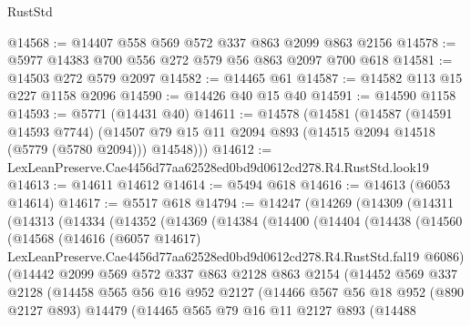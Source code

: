 \begin{lexlean}{RustStd}
\begin{coremodule}
@14568 := @14407 @558 @569 @572 @337 @863 @2099 @863 @2156
@14578 := @5977 @14383 @700 @556 @272 @579 @56 @863 @2097 @700 @618
@14581 := @14503 @272 @579 @2097
@14582 := @14465 @61
@14587 := @14582 @113 @15 @227 @1158 @2096
@14590 := @14426 @40 @15 @40
@14591 := @14590 @1158
@14593 := @5771 (@14431 @40)
@14611 := @14578
    (@14581
      (@14587
        (@14591 @14593 @7744)
        (@14507 @79 @15 @11 @2094 @893 (@14515 @2094 @14518 (@5779 (@5780 @2094))) @14548)))
@14612 := LexLeanPreserve.Cae4456d77aa62528ed0bd9d0612cd278.R4.RustStd.look19
@14613 := @14611 @14612
@14614 := @5494 @618
@14616 := @14613 (@6053 @14614)
@14617 := @5517 @618
@14794 := @14247
    (@14269
      (@14309
        (@14311
          (@14313
            (@14334
              (@14352
                (@14369
                  (@14384
                    (@14400
                      (@14404
                        (@14438
                          (@14560
                            (@14568
                              (@14616
                                (@6057 @14617)
                                LexLeanPreserve.Cae4456d77aa62528ed0bd9d0612cd278.R4.RustStd.fal19
                                @6086)
                              (@14442
                                @2099
                                @569
                                @572
                                @337
                                @863
                                @2128
                                @863
                                @2154
                                (@14452
                                  @569
                                  @337
                                  @2128
                                  (@14458
                                    @565
                                    @56
                                    @16
                                    @952
                                    @2127
                                    (@14466
                                      @567
                                      @56
                                      @18
                                      @952
                                      (@890 @2127 @893)
                                      @14479
                                      (@14465
                                        @565
                                        @79
                                        @16
                                        @11
                                        @2127
                                        @893
                                        (@14488

\end{coremodule}
\end{lexlean}
